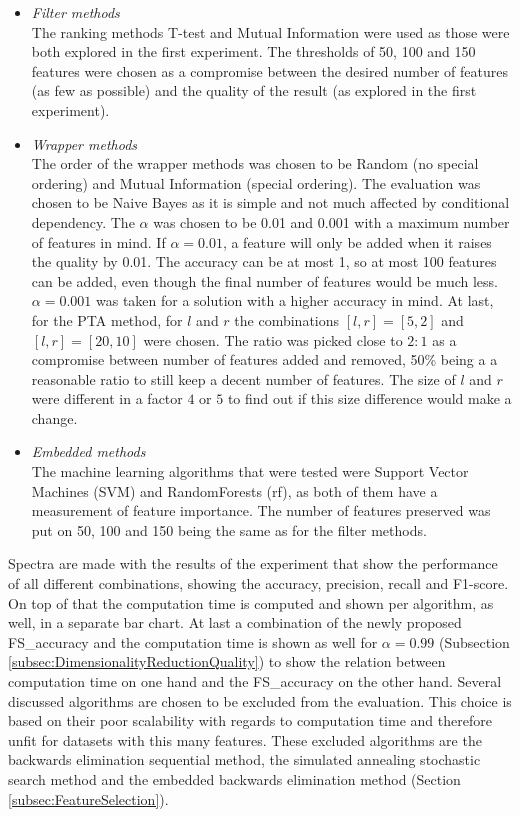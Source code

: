 	\begin{itemize}
		\item \textit{Filter methods} \\
		The ranking methods T-test and Mutual Information were used as those were both explored in the first experiment. The thresholds of 50, 100 and 150 features were chosen as a compromise between the desired number of features (as few as possible) and the quality of the result (as explored in the first experiment).
		\item \textit{Wrapper methods} \\
		The order of the wrapper methods was chosen to be Random (no special ordering) and Mutual Information (special ordering). The evaluation was chosen to be Naive Bayes as it is simple and not much affected by conditional dependency. The $\alpha$ was chosen to be 0.01 and 0.001 with a maximum number of features in mind. If $\alpha= 0.01$, a feature will only be added when it raises the quality by 0.01. The accuracy can be at most 1, so at most 100 features can be added, even though the final number of features would be much less. $\alpha = 0.001$ was taken for a solution with a higher accuracy in mind. At last, for the PTA method, for $l$ and $r$ the combinations $[l, r] = [5, 2]$ and $[l, r] = [20, 10]$ were chosen. The ratio was picked close to $2:1$ as a compromise between number of features added and removed, 50\% being a a reasonable ratio to still keep a decent number of features. The size of $l$ and $r$ were different in a factor $4$ or $5$ to find out if this size difference would make a change.
		\item \textit{Embedded methods} \\
		The machine learning algorithms that were tested were Support Vector Machines (SVM) and RandomForests (rf), as both of them have a measurement of feature importance. The number of features preserved was put on 50, 100 and 150 being the same as for the filter methods.
		
		
	\end{itemize}
	 Spectra are made with the results of the experiment that show the performance of all different combinations, showing the accuracy, precision, recall and F1-score. On top of that the computation time is computed and shown per algorithm, as well, in a separate bar chart. At last a combination of the newly proposed FS\_accuracy and the computation time is shown as well for $\alpha = 0.99$ (Subsection \ref{subsec:DimensionalityReductionQuality}) to show the relation between computation time on one hand and the FS\_accuracy on the other hand. 
	Several discussed algorithms  are chosen to be excluded from the evaluation. This choice is based on their poor scalability with regards to computation time and therefore unfit for datasets with this many features. These excluded algorithms are the backwards elimination sequential method, the simulated annealing stochastic search method and the embedded backwards elimination method (Section \ref{subsec:FeatureSelection}). 

